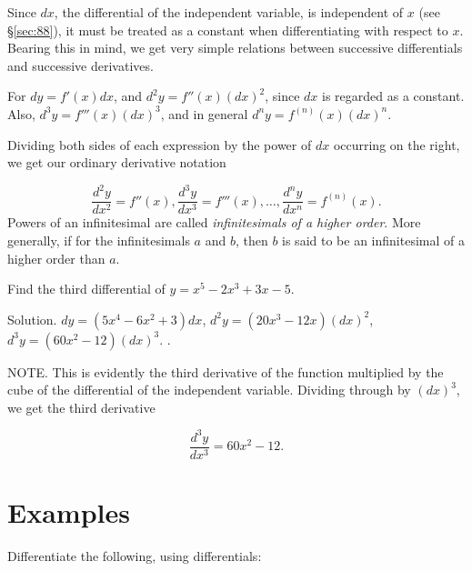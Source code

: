 Since $dx$, the differential of the independent variable, is 
independent of $x$ (see \S \ref{sec:88}), %
it must be treated as a constant when differentiating with 
respect to $x$. Bearing this in mind, we get very simple 
relations between successive differentials and successive derivatives.

For 	$dy 	= f'(x)dx$,
and 	$d^2y 	= f''(x)(dx)^2$,
since $dx$ is regarded as a constant.
Also, 	$d^3y 	= f'''(x)(dx)^3$,
and in general 	$d^ny 	= f^{(n)}(x)(dx)^n$.

Dividing both sides of each expression by the power of $dx$ occurring on 
the right, we get our ordinary derivative notation

\[
    \frac{d^2 y}{dx^2} = f''(x), 
\frac{d^3 y}{dx^3} = f'''(x), \dots, 
\frac{d^n y}{dx^n} = f^{(n)} (x).
\]
Powers of an infinitesimal are called {\it infinitesimals of a higher order}. 
More generally, if for the infinitesimals $a$ and $b$, then $b$ is said 
to be an infinitesimal of a higher order than $a$.

\begin{example}
{\rm
Find the third differential of
$y =	x^5 - 2x^3 + 3x - 5$.

Solution. $dy 	= (5x^4 - 6x^2 + 3)dx$,
  	$d^2y 	= (20x^3 - 12x)(dx)^2$,
  	$d^3y 	= (60x^2 - 12)(dx)^3$. .

NOTE. This is evidently the third derivative of the function 
multiplied by the cube of the differential of the independent 
variable. Dividing through by $(dx)^3$, we get the third derivative

\[
    \frac{d^3 y}{dx^3} = 60x^2 - 12. 
\]
}
\end{example}

\section{Examples}

Differentiate the following, using differentials:


